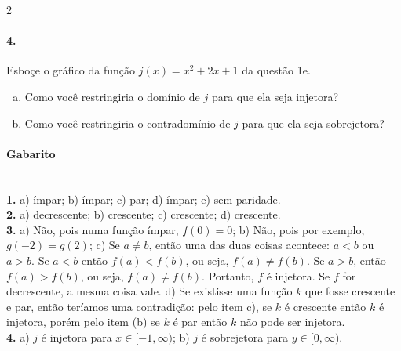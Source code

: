 \documentclass[a4paper,12pt]{article}
\begin{document}
\begin{multicols}{2}
\paragraph*{4.} Esboçe o gráfico da função $j(x) = x^2 + 2x + 1$ da questão 1e.
\begin{enumerate}[a)]
    \item Como você restringiria o domínio de $j$ para que ela seja injetora?
    \item Como você restringiria o contradomínio de $j$ para que ela seja sobrejetora?
\end{enumerate}
 \vspace*{4cm}
\end{multicols}

\vspace*{\fill}
{\footnotesize \color{darkgray} 
\paragraph*{Gabarito} \hspace*{\fill}\\
\textbf{1.} a) ímpar; b) ímpar; c) par; d) ímpar; e) sem paridade.\\   
\textbf{2.} a) decrescente; b) crescente; c) crescente; d) crescente.\\
\textbf{3.} a) Não, pois numa função ímpar, $f(0) = 0$; b)  Não, pois por exemplo, $g(-2) = g(2)$; c) Se $a\neq b$, então uma das duas coisas acontece: $a <b$ ou $a > b$. Se $a<b$ então $f(a) < f(b)$, ou seja, $f(a) \neq f(b)$. Se $a > b$, então $f(a) > f(b)$, ou seja, $f(a) \neq f(b)$. Portanto, $f$ é injetora. Se $f$ for decrescente, a mesma coisa vale. d)  Se existisse uma função $k$ que fosse crescente e par, então teríamos uma contradição: pelo item 
c), se $k$ é crescente então $k$ é injetora, porém pelo item (b) se $k$ é par então $k$ não pode ser injetora.\\
\textbf{4.} a) $j$ é injetora para $x \in [-1, \infty)$; b) $j$ é sobrejetora para $y \in [0, \infty)$.
}
\end{document}
